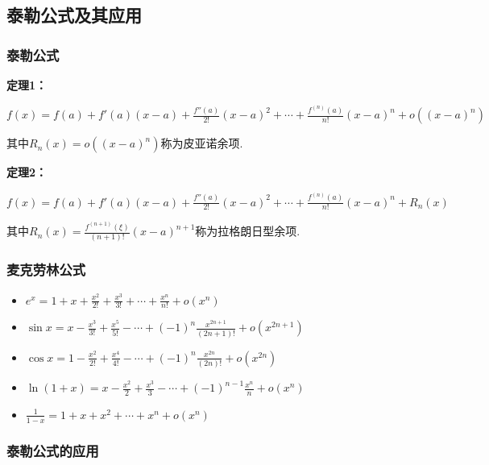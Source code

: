 \documentclass[12pt , a4paper , oneside]{ctexart}
\begin{document}
        \subsection{泰勒公式及其应用}
            \subsubsection{泰勒公式}
            \textbf{定理1：}
            \begin{mdframed}
            $f(x) = f(a) + f'(a)(x-a) + \frac{f''(a)}{2!}(x-a)^2 + \cdots + \frac{f^{(n)}(a)}{n!}(x-a)^n + o((x-a)^n)$
            \end{mdframed}
            其中$R_n(x) = o((x-a)^n)$称为皮亚诺余项.          
            
            \textbf{定理2：}
            \begin{mdframed}
            $f(x) = f(a) + f'(a)(x-a) + \frac{f''(a)}{2!}(x-a)^2 + \cdots + \frac{f^{(n)}(a)}{n!}(x-a)^n + R_n(x)$      
            \end{mdframed}          
            其中$R_n(x)=\frac{f^(n+1) (\xi)}{(n+1)!}(x-a)^{n+1}$称为拉格朗日型余项.

            \subsubsection{麦克劳林公式}
            \begin{itemize}
                \item $e^x = 1 + x + \frac{x^2}{2!} + \frac{x^3}{3!} + \cdots + \frac{x^n}{n!} + o(x^n)$
                \item $\sin x = x - \frac{x^3}{3!} + \frac{x^5}{5!} - \cdots + (-1)^n \frac{x^{2n+1}}{(2n+1)!} + o(x^{2n+1})$
                \item $\cos x = 1 - \frac{x^2}{2!} + \frac{x^4}{4!} - \cdots + (-1)^n \frac{x^{2n}}{(2n)!} + o(x^{2n})$
                \item $\ln(1+x) = x - \frac{x^2}{2} + \frac{x^3}{3} - \cdots + (-1)^{n-1} \frac{x^n}{n} + o(x^n)$
                \item $\frac{1}{1-x} = 1 + x + x^2 + \cdots + x^n + o(x^n)$
            \end{itemize}
            
            \subsubsection{泰勒公式的应用}
\end{document}
